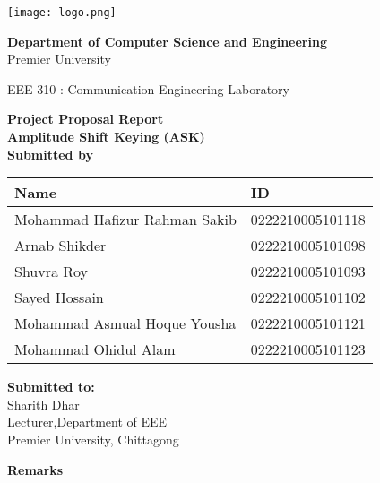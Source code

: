 \documentclass[12pt,a4paper]{article}
\begin{document}
\begin{titlepage}
    \centering
    \begin{center}
        \texttt{[image: logo.png]}
    \end{center}
\begin{center}
    \textbf{Department of Computer Science and Engineering}\\
    Premier University
\end{center}
\begin{center}
    \textnormal{EEE 310 : Communication Engineering Laboratory}
\end{center}
    \huge
    \textbf{Project Proposal Report}\\
    \vspace{0.5in}
    \LARGE
    \textbf{Amplitude Shift Keying (ASK)}\\
    \vspace{1in}
    \large
    \textbf {Submitted by}\\
    \begin{center}
        \renewcommand{\arraystretch}{1.5} %
        \begin{tabular}{|>{\raggedright\arraybackslash}p{}|p{}|} %
        \hline
        \textbf{Name} & \textbf{ID} \\
        \hline
        Mohammad Hafizur Rahman Sakib & 0222210005101118 \\
        \hline
        Arnab Shikder & 0222210005101098 \\
        \hline
        Shuvra Roy & 0222210005101093 \\
        \hline
        Sayed Hossain & 0222210005101102 \\
        \hline
        Mohammad Asmual Hoque Yousha & 0222210005101121 \\
        \hline
        Mohammad Ohidul Alam & 0222210005101123 \\
        \hline
        \end{tabular}
        \end{center}
    \vspace{0.5in}
 
    \begin{minipage}[t]{0.5\textwidth}
        \textbf{Submitted to:}
        \\ Sharith Dhar
        \\Lecturer,Department of EEE\\ Premier University, Chittagong
    \end{minipage}%
    \begin{minipage}[t]{0.6\textwidth}
        \raggedleft
        \textbf{Remarks}\\
        \vspace{0.5cm} %
    \end{minipage}

    \date{\today}
    \vfill
\end{titlepage}
\end{document}
